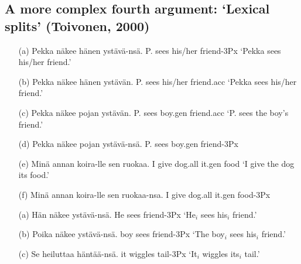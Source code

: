 \documentclass[10pt]{article}
\begin{document}
\subsection{A more complex fourth argument: `Lexical splits' (Toivonen, 2000)}



\begin{example}

\begin{itemize} 

\item[(a)] \gll Pekka n\"{a}kee h\"{a}nen yst\"{a}v\"{a}-ns\"{a}.
 P. sees his/her friend-3Px
  \glt `Pekka sees his/her friend.' 
  \glend

\item[(b)] \gll *Pekka n\"{a}kee h\"{a}nen yst\"{a}v\"{a}n.
 P. sees his/her friend.{\sc acc} 
 \glt `Pekka sees his/her friend.'
\glend
 

 \item[(c)] \gll Pekka n\"{a}kee pojan yst\"{a}v\"{a}n. 
P. sees boy.{\sc gen} friend.{\sc acc}
 \glt `P. sees the boy's friend.'
\glend 

\item[(d)]
\gll *Pekka n\"{a}kee pojan yst\"{a}v\"{a}-ns\"{a}.
 P. sees boy.{\sc gen} friend-3Px
 \gln 
\glend 
  

 \item[(e)] 
\gll Min\"{a} annan koira-lle sen ruokaa.
 I give dog.{\sc all} it.{\sc gen} food 
 \glt `I give the dog its food.' 
 \glend
  \item[(f)] 
  \gll *Min\"{a} annan koira-lle sen ruokaa-nsa. 
I give dog.{\sc all} it.{\sc gen} food-3Px
 \gln \glend \end{itemize} \end{example}



\begin{example}\label{anaph}
\begin{itemize}
\item[(a)]
\gll H\"{a}n n\"{a}kee yst\"{a}v\"{a}-ns\"{a}.
He sees friend-3Px
  \glt `He$_i$ sees his$_i$ friend.' \glend 
\item[(b)]
\gll Poika n\"{a}kee yst\"{a}v\"{a}-ns\"{a}. 
boy sees friend-3Px
 \glt `The boy$_i$ sees his$_i$ friend.' \glend
\item[(c)]\gll Se heiluttaa h\"{a}nt\"{a}\"{a}-ns\"{a}. 
it wiggles tail-3Px
 \glt `It$_i$ wiggles its$_i$ tail.' \glend
\end{itemize} 
\end{example}
\end{document}
